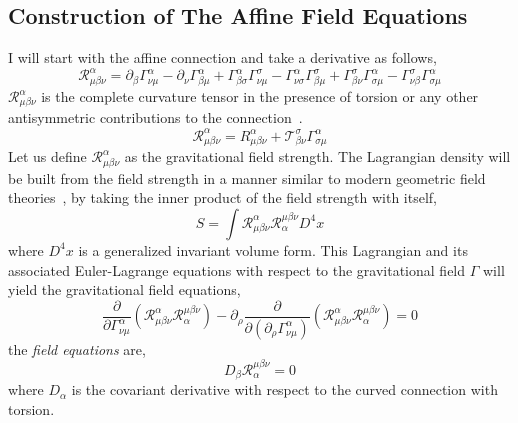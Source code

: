 \documentclass[aps,prd,preprint]{revtex4-1}
\begin{document}
\subsection*{Construction of The Affine Field Equations}
I will start with the affine connection and take a derivative as follows,
\begin{equation}
    \mathcal{R}^\alpha_{\mu\beta\nu} = \partial_{\beta}\Gamma^{\alpha}_{\nu\mu}-\partial_{\nu}\Gamma^{\alpha}_{\beta\mu}+\Gamma^{\alpha}_{\beta\sigma}\Gamma^{\sigma}_{\nu\mu} - \Gamma^{\alpha}_{\nu\sigma}\Gamma^{\sigma}_{\beta\mu} + \Gamma^{\sigma}_{\beta\nu}\Gamma^{\alpha}_{\sigma\mu}-\Gamma^{\sigma}_{\nu\beta}\Gamma^{\alpha}_{\sigma\mu}
\end{equation}
$\mathcal{R}^\alpha_{\mu\beta\nu}$ is the complete curvature tensor in the presence of torsion or any other antisymmetric contributions to the connection~\cite{watanabe_2004}.
\begin{equation}
    \mathcal{R}^\alpha_{\mu\beta\nu}=R^{\alpha}_{\mu\beta\nu}+\mathcal{T}^{\sigma}_{\beta\nu}\Gamma^{\alpha}_{\sigma\mu}
\end{equation}
Let us define $\mathcal{R}^\alpha_{\mu\beta\nu}$ as the gravitational field strength. The Lagrangian density will be built from the field strength in a manner similar to modern geometric field theories~\cite{peskin_1995,weinberg_1995}, by taking the inner product of the field strength with itself,
\begin{equation}\label{higher_order_action}
    S=\int{\mathcal{R}^\alpha_{\mu\beta\nu}\mathcal{R}_\alpha^{\mu\beta\nu}D^4x}
\end{equation}
where $D^4x$ is a generalized invariant volume form.
This Lagrangian and its associated Euler-Lagrange equations with respect to the gravitational field $\Gamma$ will yield the gravitational field equations,
\begin{equation}\label{euler-lagrange}
    \frac{\partial}{\partial\Gamma^{\alpha}_{\nu\mu}}\left(\mathcal{R}^\alpha_{\mu\beta\nu}\mathcal{R}_\alpha^{\mu\beta\nu}\right) - \partial_{\rho}\frac{\partial}{\partial(\partial_{\rho}\Gamma^{\alpha}_{\nu\mu})}\left(\mathcal{R}^\alpha_{\mu\beta\nu}\mathcal{R}_\alpha^{\mu\beta\nu}\right) = 0
\end{equation}
the {\it field equations\/} are,
\begin{equation}\label{higher_order_field_eq}
    D_\beta \mathcal{R}_\alpha^{\mu\beta\nu} = 0
\end{equation}
where $D_\alpha$ is the covariant derivative with respect to the curved connection with torsion.
\end{document}

